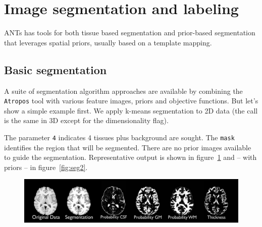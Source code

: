 \documentclass{InsightArticle}
\begin{document}
\newpage
\section{Image segmentation and labeling}
ANTs has tools for both tissue based segmentation and prior-based segmentation that 
leverages spatial priors, usually based on a template mapping.  
\subsection{Basic segmentation}
A suite of segmentation algorithm approaches are available by
combining the \texttt{Atropos} tool with various feature images,
priors and objective functions.  But let's show a simple example
first. We apply k-means segmentation to 2D data (the call is the same
in 3D except for the dimensionality flag). 

The parameter \texttt{4} indicates 4 tissues plus background are
sought.  The \texttt{mask} identifies the region that will be segmented. 
There are no prior images available to guide the segmentation.
Representative output is shown 
in figure~\ref{fig:seg} and -- with priors -- in figure~\ref{fig:seg2}.
\begin{figure}
\includegraphics[width=1\textwidth]{Figures/segmentation.pdf} 
\label{fig:seg}
\end{figure}
\end{document}

